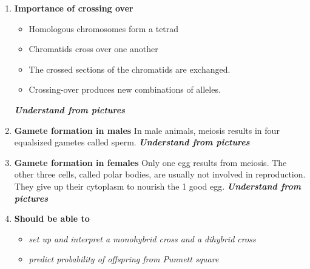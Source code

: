 \documentclass[9pt]{article}
\begin{document}
\begin{enumerate}
\item {\bf Importance of crossing over}
  \begin{itemize}
    \item Homologous chromosomes form a tetrad
    \item Chromatids cross over one another
    \item The crossed sections of the chromatids are exchanged.
    \item Crossing-over produces new combinations of alleles.
  \end{itemize}
  {\bf \it Understand from pictures}
\item {\bf Gamete formation in males} In male animals, meiosis results
  in four equalsized gametes called sperm. {\bf \it Understand from
    pictures}
\item {\bf Gamete formation in females} Only one egg results from
  meiosis. The other three cells, called polar bodies, are usually not
  involved in reproduction.  They give up their cytoplasm to nourish
  the 1 good egg. {\bf \it Understand from pictures}
\item {\bf Should be able to}
  \begin{itemize}
    \item {\em set up and interpret a monohybrid cross and a dihybrid cross}
    \item {\em predict probability of offspring from Punnett square}
  \end{itemize}
\end{enumerate}
\end{document}
